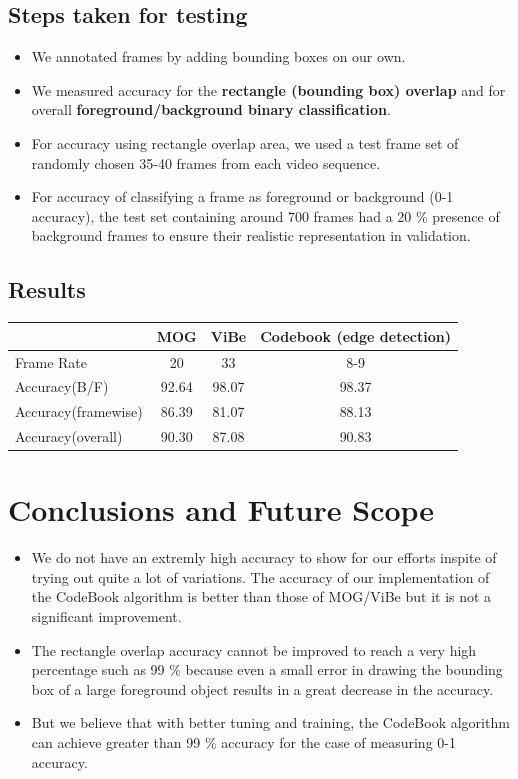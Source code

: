 \documentclass[12pt,a4paper]{article}
\begin{document}
\subsection{Steps taken for testing}
\begin{itemize}
\item We annotated frames by adding bounding boxes on our own.
\item We measured accuracy for the \textbf{rectangle (bounding box) overlap} and for overall \textbf{foreground/background binary classification}.
\item For accuracy using rectangle overlap area, we used a test frame set of randomly chosen 35-40 frames from each video sequence.
\item For accuracy of classifying a frame as foreground or background (0-1 accuracy), the test set containing around 700 frames had a 20 \% presence of background frames to ensure their realistic representation in validation.
\end{itemize}

\subsection{Results}
\begin{tabular}{l | c | c | c   }   
 & MOG & ViBe & Codebook (edge detection)\\
\hline \hline
Frame Rate& 20 & 33 & 8-9   \\  
Accuracy(B/F) & 92.64 & 98.07 & 98.37 \\
Accuracy(framewise) & 86.39 & 81.07 & 88.13  \\  
Accuracy(overall) & 90.30 & 87.08 & 90.83
\end{tabular}

\section{Conclusions and Future Scope}
\begin{itemize}
\item We do not have an extremly high accuracy to show for our efforts inspite of trying out quite a lot of variations. The accuracy of our implementation of the CodeBook algorithm is better than those of MOG/ViBe but it is not a significant improvement.
\item The rectangle overlap accuracy cannot be improved to reach a very high percentage such as 99 \% because even a small error in drawing the bounding box of a large foreground object results in a great decrease in the accuracy.
\item But we believe that with better tuning and training, the CodeBook algorithm can achieve greater than 99 \% accuracy for the case of measuring 0-1 accuracy.
\end{itemize}
\end{document}
